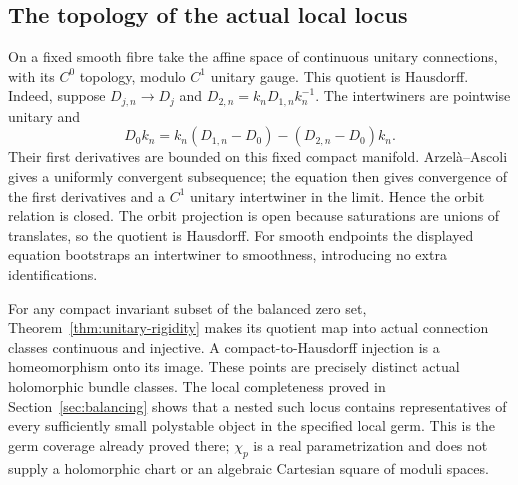 \subsection{The topology of the actual local locus}

On a fixed smooth fibre take the affine space of continuous
unitary connections, with its $C^0$ topology, modulo $C^1$
unitary gauge. This quotient is Hausdorff. Indeed, suppose
$D_{j,n}\to D_j$ and $D_{2,n}=k_nD_{1,n}k_n^{-1}$.
The intertwiners are pointwise unitary and
\[
 D_0k_n=k_n(D_{1,n}-D_0)-(D_{2,n}-D_0)k_n.
\]
Their first derivatives are bounded on this fixed compact
manifold. Arzelà--Ascoli gives a uniformly convergent
subsequence; the equation then gives convergence of the
first derivatives and a $C^1$ unitary intertwiner in the
limit. Hence the orbit relation is closed. The orbit
projection is open because saturations are unions of
translates, so the quotient is Hausdorff. For smooth
endpoints the displayed equation bootstraps an intertwiner
to smoothness, introducing no extra identifications.

For any compact invariant subset of the balanced zero
set, Theorem~\ref{thm:unitary-rigidity} makes its quotient
map into actual connection classes continuous and
injective. A compact-to-Hausdorff injection is a
homeomorphism onto its image. These points are precisely
distinct actual holomorphic bundle classes.
The local completeness proved in Section~\ref{sec:balancing}
shows that a nested such locus contains representatives
of every sufficiently small polystable object in the
specified local germ. This is the germ coverage already
proved there; $\chi_p$ is a real parametrization and
does not supply a holomorphic chart or an algebraic
Cartesian square of moduli spaces.
